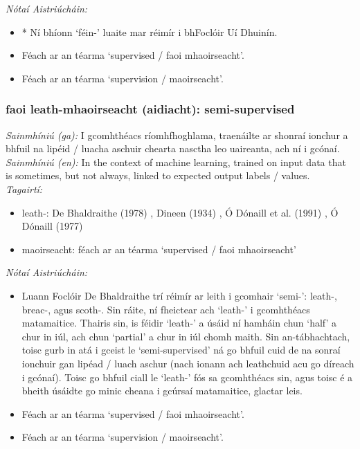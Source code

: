  \noindent \textit{Nótaí Aistriúcháin:}
\begin{itemize}
	\item * Ní bhíonn `féin-' luaite mar réimír i bhFoclóir Uí Dhuinín.
	\item Féach ar an téarma `supervised / faoi mhaoirseacht'.
	\item Féach ar an téarma `supervision / maoirseacht'.
\end{itemize}


\subsubsection*{faoi leath-mhaoirseacht (aidiacht): semi-supervised}
 \noindent \textit{Sainmhíniú (ga):} I gcomhthéacs ríomhfhoghlama, traenáilte ar shonraí ionchur a bhfuil na lipéid / luacha aschuir chearta nasctha leo uaireanta, ach ní i gcónaí.
\\
 \noindent \textit{Sainmhíniú (en):} In the context of machine learning, trained on input data that is sometimes, but not always, linked to expected output labels / values.
\\
 \noindent \textit{Tagairtí:}
\begin{itemize}
	\item leath-: De Bhaldraithe (1978) \cite{de-bhaldraithe}, Dineen (1934) \cite{dineen}, Ó Dónaill et al. (1991) \cite{focloir-beag}, Ó Dónaill (1977) \cite{odonaill}
	\item maoirseacht: féach ar an téarma `supervised / faoi mhaoirseacht'
\end{itemize}

 \noindent \textit{Nótaí Aistriúcháin:}
\begin{itemize}
	\item Luann Foclóir De Bhaldraithe trí réimír ar leith i gcomhair `semi-': leath-, breac-, agus scoth-. Sin ráite, ní fheictear ach `leath-' i gcomhthéacs matamaitice. Thairis sin, is féidir `leath-' a úsáid ní hamháin chun `half' a chur in iúl, ach chun `partial' a chur in iúl chomh maith. Sin an-tábhachtach, toisc gurb in atá i gceist le `semi-supervised' ná go bhfuil cuid de na sonraí ionchuir gan lipéad / luach aschur (nach ionann ach leathchuid acu go díreach i gcónaí). Toisc go bhfuil ciall le `leath-' fós sa gcomhthéacs sin, agus toisc é a bheith úsáidte go minic cheana i gcúrsaí matamaitice, glactar leis.
	\item Féach ar an téarma `supervised / faoi mhaoirseacht'.
	\item Féach ar an téarma `supervision / maoirseacht'.
\end{itemize}


